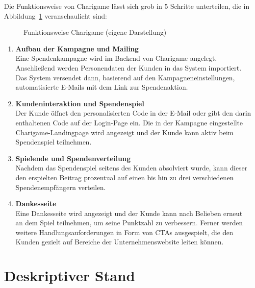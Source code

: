Die Funktionsweise von Charigame lässt sich grob in 5 Schritte unterteilen, die in Abbildung~\ref{fig:charigame-funktion} veranschaulicht sind:

\begin{figure}[H]
    \centering
    
    \caption{Funktionsweise Charigame (eigene Darstellung)}
    \label{fig:charigame-funktion}
\end{figure}

\begin{enumerate}
    \item \textbf{Aufbau der Kampagne und Mailing}
    \\ Eine Spendenkampagne wird im Backend von Charigame angelegt.
    Anschließend werden Personendaten der Kunden in das System importiert.
    Das System versendet dann, basierend auf den Kampagneneinstellungen, automatisierte E-Mails mit dem Link zur Spendenaktion.
    \item \textbf{Kundeninteraktion und Spendenspiel}
    \\ Der Kunde öffnet den personalisierten Code in der E-Mail oder gibt den darin enthaltenen Code auf der Login-Page ein.
    Die in der Kampagne eingestellte Charigame-Landingpage wird angezeigt und der Kunde kann aktiv beim Spendenspiel teilnehmen.
    \item \textbf{Spielende und Spendenverteilung}
    \\ Nachdem das Spendenspiel seitens des Kunden absolviert wurde, kann dieser den erspielten Beitrag prozentual auf einen bis hin zu drei verschiedenen Spendenempfängern verteilen.
    \item \textbf{Dankesseite}
    \\ Eine Dankesseite wird angezeigt und der Kunde kann nach Belieben erneut an dem Spiel teilnehmen, um seine Punktzahl zu verbessern.
    Ferner werden weitere Handlungsauforderungen in Form von CTAs ausgespielt, die den Kunden gezielt auf Bereiche der Unternehmenswebsite leiten können.
\end{enumerate}

\section{Deskriptiver Stand}

